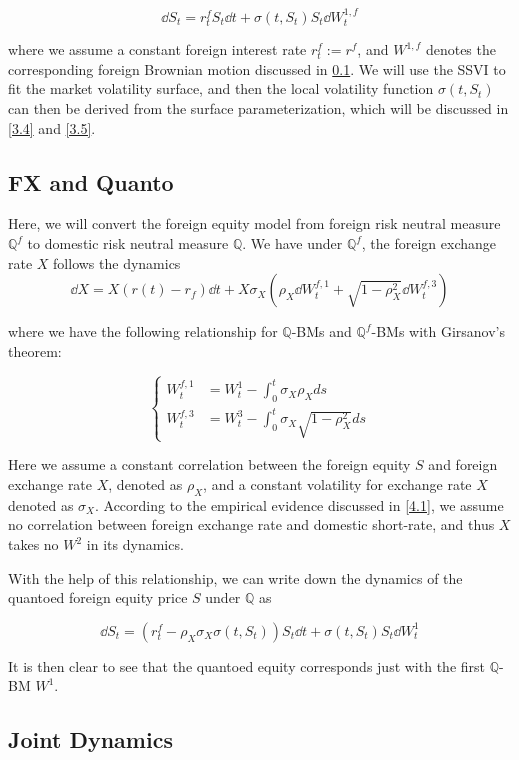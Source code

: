 \documentclass[11pt]{article}
\numberwithin{equation}{section}
\theoremstyle{remark}
\begin{document}
$$ \dd{S_t} = r_t^f S_t \dd t + \sigma(t, S_t)S_t \dd W_t^{1,f}$$

where we assume a constant foreign interest rate $r_t^f:=r^f$, and $W^{1,f}$ denotes the corresponding foreign Brownian motion discussed in \ref{2.3}. We will use the SSVI to fit the market volatility surface, and then the local volatility function $\sigma\left(t,S_t\right)$ can then be derived from the surface parameterization, which will be discussed in \ref{3.4} and \ref{3.5}.

\subsection{FX and Quanto}\label{2.3}

Here, we will convert the foreign equity model from foreign risk neutral measure $\mathbb{Q}^f$ to domestic risk neutral measure $\mathbb{Q}$. We have under $\mathbb{Q}^f$, the foreign exchange rate $X$ follows the dynamics
$$ \dd X = X \left(r(t)-r_f \right) \dd t + X \sigma_X \left( \rho_X \dd W_t^{f,1}+\sqrt{1-\rho_X^2} \dd W_t^{f,3} \right)$$

where we have the following relationship for $\mathbb{Q}$-BMs and $\mathbb{Q}^f$-BMs with Girsanov's theorem:

$$
\left\{
\begin{array}{ll}
W_t^{f,1} & = W_t^1 - \int_0^t \sigma_X \rho_X ds \\
W_t^{f,3} & = W_t^3 - \int_0^t \sigma_X \sqrt{1-\rho_X^2} ds
\end{array}
\right.
$$

Here we assume a constant correlation between the foreign equity $S$ and foreign exchange rate $X$, denoted as $\rho_X$, and a constant volatility for exchange rate $X$ denoted as $\sigma_X$. According to the empirical evidence discussed in \ref{4.1}, we assume no correlation between foreign exchange rate and domestic short-rate, and thus $X$ takes no $W^2$ in its dynamics.

With the help of this relationship, we can write down the dynamics of the quantoed foreign equity price $S$ under $\mathbb{Q}$ as

$$ \dd S_t = \left( r_t^f - \rho_X \sigma_X \sigma(t,S_t) \right) S_t \dd t + \sigma(t,S_t) S_t \dd W_t^1$$

It is then clear to see that the quantoed equity corresponds just with the first $\mathbb{Q}$-BM $W^1$.

\subsection{Joint Dynamics}\label{2.4}
\end{document}
